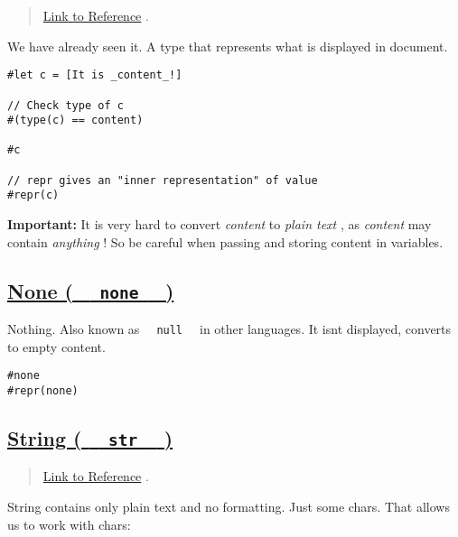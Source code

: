 \begin{quote}
\href{https://typst.app/docs/reference/foundations/content/}{Link to
Reference} .
\end{quote}

We have already seen it. A type that represents what is displayed in
document.

\begin{verbatim}
#let c = [It is _content_!]

// Check type of c
#(type(c) == content)

#c

// repr gives an "inner representation" of value
#repr(c)
\end{verbatim}

\pandocbounded{}

\textbf{Important:} It is very hard to convert \emph{content} to
\emph{plain text} , as \emph{content} may contain \emph{anything} ! So
be careful when passing and storing content in variables.

\subsection{\texorpdfstring{\hyperref[none-none]{None (
\texttt{\ }{\texttt{\ none\ }}\texttt{\ }
)}}{None (   none   )}}\label{none-none}

Nothing. Also known as \texttt{\ }{\texttt{\ null\ }}\texttt{\ } in
other languages. It isn\textquotesingle t displayed, converts to empty
content.

\begin{verbatim}
#none
#repr(none)
\end{verbatim}

\pandocbounded{}

\subsection{\texorpdfstring{\hyperref[string-str]{String (
\texttt{\ }{\texttt{\ str\ }}\texttt{\ }
)}}{String (   str   )}}\label{string-str}

\begin{quote}
\href{https://typst.app/docs/reference/foundations/str/}{Link to
Reference} .
\end{quote}

String contains only plain text and no formatting. Just some chars. That
allows us to work with chars:


